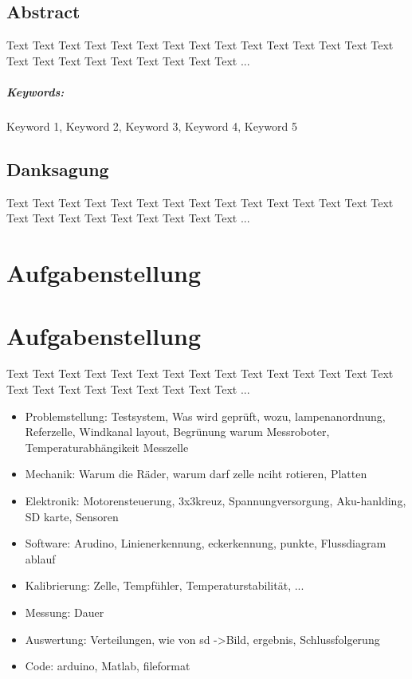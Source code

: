 \documentclass[a4paper,bibtotoc,oneside]{scrbook}
\begin{document}
\newpage

\section*{Abstract}\thispagestyle{empty}
Text Text Text Text Text Text Text Text Text Text Text Text Text Text Text Text Text Text Text Text Text Text Text Text ...
\\ \vfill
\paragraph*{Keywords:} Keyword 1, Keyword 2, Keyword 3, Keyword 4, Keyword 5
\newpage

\section*{Danksagung}\thispagestyle{empty}
Text Text Text Text Text Text Text Text Text Text Text Text Text Text Text Text Text Text Text Text Text Text Text Text ...
\newpage

\tableofcontents\thispagestyle{empty}
\newpage

\setcounter{page}{1}

\chapter[]{Aufgabenstellung}

\chapter[]{Aufgabenstellung}

Text Text Text Text Text Text Text Text Text Text Text Text Text Text Text Text Text Text Text Text Text Text Text Text ...

\begin{itemize}
\item Problemstellung: Testsystem, Was wird geprüft, wozu, lampenanordnung, Referzelle, Windkanal layout, Begrünung warum Messroboter, Temperaturabhängikeit Messzelle
\item Mechanik: Warum die Räder, warum darf zelle nciht rotieren, Platten
\item Elektronik: Motorensteuerung, 3x3kreuz, Spannungversorgung, Aku-hanlding, SD karte, Sensoren
\item Software: Arudino, Linienerkennung, eckerkennung, punkte, Flussdiagram ablauf
\item Kalibrierung: Zelle, Tempfühler, Temperaturstabilität, ...
\item Messung: Dauer
\item Auswertung: Verteilungen, wie von sd ->Bild, ergebnis, Schlussfolgerung
\item Code: arduino, Matlab, fileformat
\end{itemize}
\end{document}

